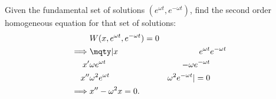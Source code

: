 \begin{example}
	Given the fundamental set of solutions $(e^{\omega t},e^{-\omega t})$, find the second order homogeneous equation for that set of solutions:
	\begin{align*}
		         & W(x,e^{\omega t},e^{-\omega t})=0                                \\
		\implies & \mqty|x                           & e^{\omega t} & e^{-\omega t} \\x'&\omega e^{\omega t}&-\omega e^{-\omega t}\\x''&\omega^2e^{\omega t}&\omega^2e^{-\omega t}|=0\\
		\implies & x''-\omega^2x=0
		.\end{align*}
\end{example}
